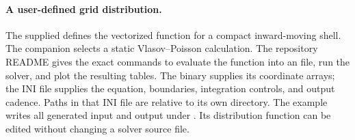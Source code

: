 \paragraph{A user-defined grid distribution.}
The supplied  defines the vectorized
function  for a compact inward-moving shell.
The companion  selects a
static Vlasov--Poisson calculation. The repository README gives the exact
commands to evaluate the function into an  file, run the
solver, and plot the resulting tables. The binary supplies its coordinate
arrays; the INI file supplies the equation, boundaries, integration controls,
and output cadence. Paths in that INI file are relative to its own directory.
The example writes all generated input and output under
. Its distribution function can be edited
without changing a solver source file.
